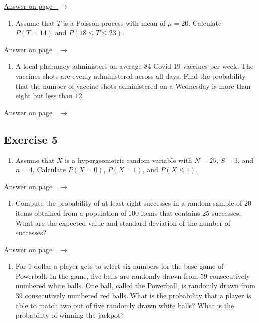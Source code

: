 \documentclass[
  11pt,
  letterpaper,
  DIV=11,
  numbers=noendperiod,
  oneside,
  open=any]{scrreprt}
\providecommand{\tightlist}{%
  \setlength{\itemsep}{0pt}\setlength{\parskip}{0pt}}\usepackage{longtable,booktabs,array}
\newcommand{\bsanswerref}[1]{%
  \par\nopagebreak\hypertarget{q-#1}{}\label{q-#1}%
  {\raggedleft\sffamily\footnotesize\hyperlink{a-#1}{\textcolor{bsaccent}{Answer on page \pageref{a-#1}\ $\rightarrow$}}\par}%
  \medskip}
\begin{document}
\bsanswerref{bsans91}

\begin{enumerate}
\def\labelenumi{\arabic{enumi}.}
\setcounter{enumi}{1}
\tightlist
\item
  Assume that \(T\) is a Poisson process with mean of \(\mu=20\).
  Calculate \(P(T=14)\) and \(P(18 \leq T \leq 23)\).
\end{enumerate}

\bsanswerref{bsans92}

\begin{enumerate}
\def\labelenumi{\arabic{enumi}.}
\setcounter{enumi}{2}
\tightlist
\item
  A local pharmacy administers on average \(84\) Covid-19 vaccines per
  week. The vaccines shots are evenly administered across all days. Find
  the probability that the number of vaccine shots administered on a
  Wednesday is more than eight but less than \(12\).
\end{enumerate}

\bsanswerref{bsans93}

\subsection*{Exercise 5}\label{exercise-5-4}

\begin{enumerate}
\def\labelenumi{\arabic{enumi}.}
\tightlist
\item
  Assume that \(X\) is a hypergeometric random variable with \(N=25\),
  \(S=3\), and \(n=4\). Calculate \(P(X=0)\), \(P(X=1)\), and
  \(P(X \leq 1)\).
\end{enumerate}

\bsanswerref{bsans94}

\begin{enumerate}
\def\labelenumi{\arabic{enumi}.}
\setcounter{enumi}{1}
\tightlist
\item
  Compute the probability of at least eight successes in a random sample
  of \(20\) items obtained from a population of \(100\) items that
  contains \(25\) successes. What are the expected value and standard
  deviation of the number of successes?
\end{enumerate}

\bsanswerref{bsans95}

\begin{enumerate}
\def\labelenumi{\arabic{enumi}.}
\setcounter{enumi}{2}
\tightlist
\item
  For \(1\) dollar a player gets to select six numbers for the base game
  of Powerball. In the game, five balls are randomly drawn from \(59\)
  consecutively numbered white balls. One ball, called the Powerball, is
  randomly drawn from \(39\) consecutively numbered red balls. What is
  the probability that a player is able to match two out of five
  randomly drawn white balls? What is the probability of winning the
  jackpot?
\end{enumerate}
\end{document}
